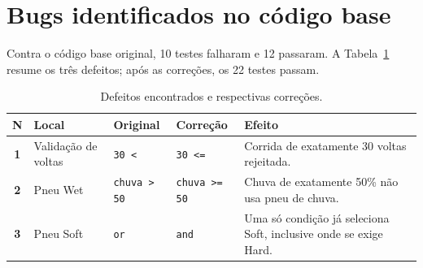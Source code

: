 \documentclass[12pt,a4paper]{article}
\begin{document}
\section{Bugs identificados no código base}

Contra o código base original, 10 testes falharam e 12 passaram. A Tabela~\ref{tab:bugs} resume os
três defeitos; após as correções, os 22 testes passam.

\begin{table}[htbp]
\centering
\caption{Defeitos encontrados e respectivas correções.}
\label{tab:bugs}
\small
\begin{tabularx}{\textwidth}{>{\bfseries}clllX}
\toprule
N & Local & Original & Correção & Efeito\\
\midrule
1 & Validação de voltas & \texttt{30 <} & \texttt{30 <=} & Corrida de exatamente 30 voltas rejeitada. \\
2 & Pneu Wet & \texttt{chuva > 50} & \texttt{chuva >= 50} & Chuva de exatamente 50\% não usa pneu de chuva. \\
3 & Pneu Soft & \texttt{or} & \texttt{and} & Uma só condição já seleciona Soft, inclusive onde se exige Hard. \\
\bottomrule
\end{tabularx}
\end{table}
\end{document}
